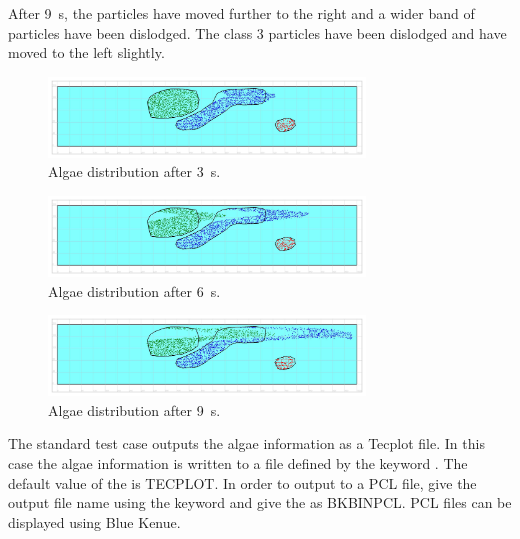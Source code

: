 \smallskip
After 9~s, the particles have moved further to the right and a wider band
of particles have been dislodged.
The class 3 particles have been dislodged and have moved to the left slightly.

\begin{figure}[h]
  \begin{center}
    \includegraphics[width=0.75\textwidth]{./img/algae2dcouplingRes3s}
  \end{center}
  \caption{Algae distribution after 3~s.}
  \label{fig:res2d_3s}
\end{figure}

\begin{figure}[h]
  \begin{center}
    \includegraphics[width=0.75\textwidth]{./img/algae2dcouplingRes6s}
  \end{center}
  \caption{Algae distribution after 6~s.}
  \label{fig:res2d_6s}
\end{figure}

\begin{figure}[h]
  \begin{center}
    \includegraphics[width=0.75\textwidth]{./img/algae2dcouplingRes9s}
  \end{center}
  \caption{Algae distribution after 9~s.}
  \label{fig:res2d_9s}
\end{figure}

The standard test case outputs the algae information as a Tecplot file.
In this case the algae information is written to a file defined by the keyword
.
The default value of the  is TECPLOT.
In order to output to a PCL file, give the output file name using the keyword
 and give the  as
BKBINPCL.
PCL files can be displayed using Blue Kenue.

